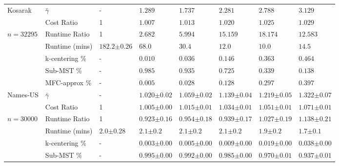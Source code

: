 \begin{table}[t!]
{\begin{tabular}{ llllllll }
			\cmidrule(lr){1-8}
			Kosarak & $ \bar{\gamma} $ & - & $ 1.289  $ & $ 1.737  $ & $ 2.281  $ & $ 2.788  $ & $ 3.129  $ \\
			& Cost Ratio & 1 & $ 1.007  $ & $ 1.013  $ & $ 1.020  $ & $ 1.025  $ & $ 1.029  $ \\
			$ n=32295$ & Runtime Ratio & 1 & $ 2.682  $ & $ 5.994  $ & $ 15.159  $ & $ 18.174  $ & $ 12.583  $ \\
			& Runtime (mins) & $182.2 \scriptstyle{ \pm 0.26 } $ & $ 68.0  $ & $ 30.4  $ & $ 12.0  $ & $ 10.0  $ & $ 14.5  $ \\
			& k-centering \% & - & $ 0.010  $ & $ 0.036  $ & $ 0.146  $ & $ 0.363  $ & $ 0.464  $ \\
			& Sub-MST \% & - & $ 0.985  $ & $ 0.935  $ & $ 0.725  $ & $ 0.339  $ & $ 0.138  $ \\
			& MFC-approx \% & - & $ 0.005  $ & $ 0.028  $ & $ 0.128  $ & $ 0.297  $ & $ 0.397  $ \\
			\cmidrule(lr){1-8}
			Names-US & $ \bar{\gamma} $ & - & $ 1.020  \scriptstyle{ \pm  0.02  } $ & $ 1.059  \scriptstyle{ \pm  0.02  } $ & $ 1.139  \scriptstyle{ \pm  0.04  } $ & $ 1.219  \scriptstyle{ \pm  0.05  } $ & $ 1.322  \scriptstyle{ \pm  0.07  } $ \\
			& Cost Ratio & 1 & $ 1.005  \scriptstyle{ \pm  0.00  } $ & $ 1.015  \scriptstyle{ \pm  0.01  } $ & $ 1.034  \scriptstyle{ \pm  0.01  } $ & $ 1.051  \scriptstyle{ \pm  0.01  } $ & $ 1.071  \scriptstyle{ \pm  0.01  } $ \\
			$ n=30000$ & Runtime Ratio & 1 & $ 0.923  \scriptstyle{ \pm  0.16  } $ & $ 0.954  \scriptstyle{ \pm  0.18  } $ & $ 0.939  \scriptstyle{ \pm  0.17  } $ & $ 1.027  \scriptstyle{ \pm  0.19  } $ & $ 1.138  \scriptstyle{ \pm  0.21  } $ \\
			& Runtime (mins) & $2.0 \scriptstyle{ \pm 0.28 } $ & $ 2.1  \scriptstyle{ \pm  0.2  } $ & $ 2.1  \scriptstyle{ \pm  0.2  } $ & $ 2.1  \scriptstyle{ \pm  0.2  } $ & $ 1.9  \scriptstyle{ \pm  0.2  } $ & $ 1.7  \scriptstyle{ \pm  0.1  } $ \\
			& k-centering \% & - & $ 0.003  \scriptstyle{ \pm  0.00  } $ & $ 0.005  \scriptstyle{ \pm  0.00  } $ & $ 0.009  \scriptstyle{ \pm  0.00  } $ & $ 0.019  \scriptstyle{ \pm  0.00  } $ & $ 0.038  \scriptstyle{ \pm  0.00  } $ \\
			& Sub-MST \% & - & $ 0.995  \scriptstyle{ \pm  0.00  } $ & $ 0.992  \scriptstyle{ \pm  0.00  } $ & $ 0.985  \scriptstyle{ \pm  0.00  } $ & $ 0.970  \scriptstyle{ \pm  0.01  } $ & $ 0.937  \scriptstyle{ \pm  0.01  } $ \\

\end{tabular}}
\end{table}
